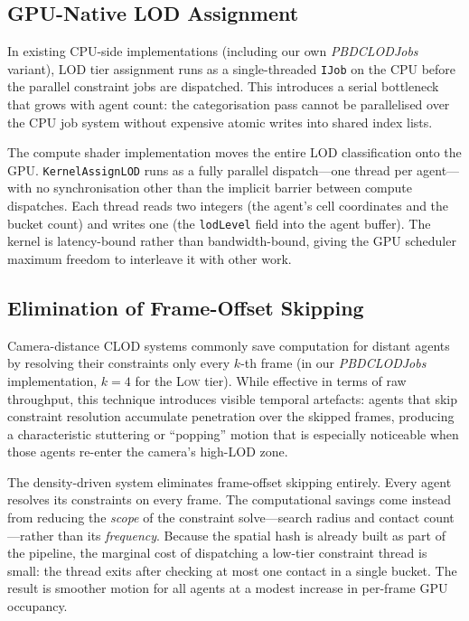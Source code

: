 \subsection{GPU-Native LOD Assignment}

In existing CPU-side implementations (including our own \textit{PBDCLODJobs}
variant), LOD tier assignment runs as a single-threaded \texttt{IJob} on the
CPU before the parallel constraint jobs are dispatched.  This introduces a
serial bottleneck that grows with agent count: the categorisation pass cannot
be parallelised over the CPU job system without expensive atomic writes into
shared index lists.

The compute shader implementation moves the entire LOD classification onto the
GPU.  \texttt{KernelAssignLOD} runs as a fully parallel dispatch---one thread
per agent---with no synchronisation other than the implicit barrier between
compute dispatches.  Each thread reads two integers (the agent's cell
coordinates and the bucket count) and writes one (the \texttt{lodLevel} field
into the agent buffer).  The kernel is latency-bound rather than
bandwidth-bound, giving the GPU scheduler maximum freedom to interleave it with
other work.

\subsection{Elimination of Frame-Offset Skipping}

Camera-distance CLOD systems commonly save computation for distant agents by
resolving their constraints only every $k$-th frame (in our \textit{PBDCLODJobs}
implementation, $k = 4$ for the \textsc{Low} tier).  While effective in terms
of raw throughput, this technique introduces visible temporal artefacts: agents
that skip constraint resolution accumulate penetration over the skipped frames,
producing a characteristic stuttering or ``popping'' motion that is especially
noticeable when those agents re-enter the camera's high-LOD zone.

The density-driven system eliminates frame-offset skipping entirely.  Every
agent resolves its constraints on every frame.  The computational savings come
instead from reducing the \emph{scope} of the constraint solve---search radius
and contact count---rather than its \emph{frequency}.  Because the spatial hash
is already built as part of the pipeline, the marginal cost of dispatching a
low-tier constraint thread is small: the thread exits after checking at most
one contact in a single bucket.  The result is smoother motion for all agents
at a modest increase in per-frame GPU occupancy.

